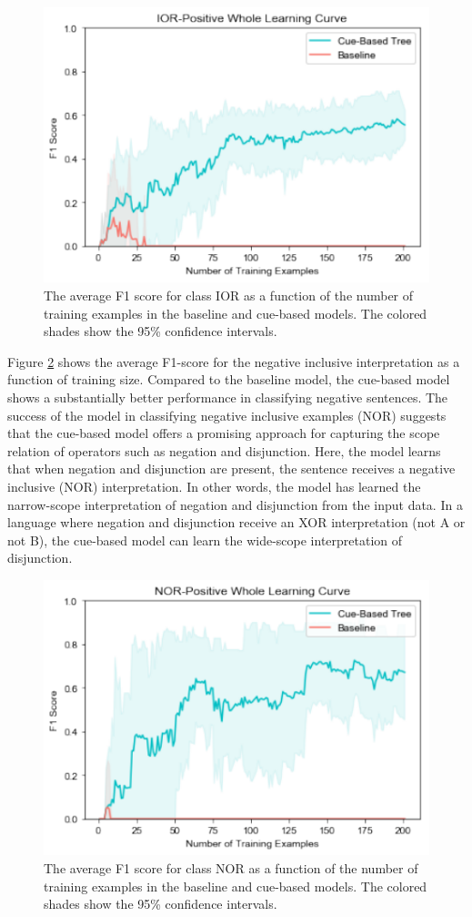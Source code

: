 \documentclass[floatsintext,man]{apa6}
\theoremstyle{definition}
\theoremstyle{definition}
\theoremstyle{definition}
\theoremstyle{remark}
\begin{document}
\begin{figure}
\centering
\includegraphics{figs/IORWhole-1.pdf}
\caption{\label{fig:IORWhole}The average F1 score for class IOR as a
function of the number of training examples in the baseline and
cue-based models. The colored shades show the 95\% confidence
intervals.}
\end{figure}

Figure \ref{fig:NORWhole} shows the average F1-score for the negative
inclusive interpretation as a function of training size. Compared to the
baseline model, the cue-based model shows a substantially better
performance in classifying negative sentences. The success of the model
in classifying negative inclusive examples (NOR) suggests that the
cue-based model offers a promising approach for capturing the scope
relation of operators such as negation and disjunction. Here, the model
learns that when negation and disjunction are present, the sentence
receives a negative inclusive (NOR) interpretation. In other words, the
model has learned the narrow-scope interpretation of negation and
disjunction from the input data. In a language where negation and
disjunction receive an XOR interpretation (not A or not B), the
cue-based model can learn the wide-scope interpretation of disjunction.

\begin{figure}
\centering
\includegraphics{figs/NORWhole-1.pdf}
\caption{\label{fig:NORWhole}The average F1 score for class NOR as a
function of the number of training examples in the baseline and
cue-based models. The colored shades show the 95\% confidence
intervals.}
\end{figure}
\end{document}
